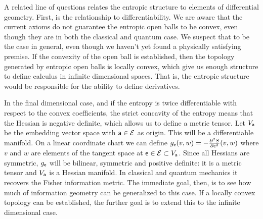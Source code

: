 A related line of questions relates the entropic structure to elements of differential geometry. First, is the relationship to differentiability. We are aware that the current axioms do not guarantee the entropic open balls to be convex, even though they are in both the classical and quantum case. We suspect that to be the case in general, even though we haven't yet found a physically satisfying premise. If the convexity of the open ball is established, then the topology generated by entropic open balls is locally convex, which give us enough structure to define calculus in infinite dimensional spaces. That is, the entropic structure would be responsible for the ability to define derivatives.

In the final dimensional case, and if the entropy is twice differentiable with respect to the convex coefficients, the strict concavity of the entropy means that the Hessian is negative definite, which allows us to define a metric tensor. Let $V_{\ens[a]}$ be the embedding vector space with $\ens[a] \in \Ens$ as origin. This will be a differentiable manifold. On a linear coordinate chart we can define $g_{\ens}( v, w ) = - \frac{\partial^2 S}{\partial \ens ^2}( v, w )$ where $v$ and $w$ are elements of the tangent space at $\ens \in \Ens \subset V_{\ens[a]}$. Since all Hessians are symmetric, $g_{\ens}$ will be bilinear, symmetric and positive definite: it is a metric tensor and $V_{\ens[a]}$ is a Hessian manifold. In classical and quantum mechanics it recovers the Fisher information metric. The immediate goal, then, is to see how much of information geometry can be generalized to this case. If a locally convex topology can be established, the further goal is to extend this to the infinite dimensional case.

